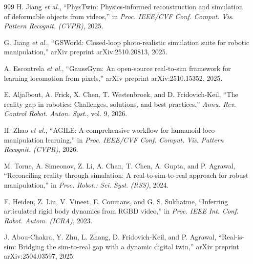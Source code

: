 \documentclass[12pt,a4paper,oneside]{report}
\begin{document}
\begin{thebibliography}{999}
H. Jiang \textit{et al.}, ``PhysTwin: Physics-informed reconstruction and simulation of deformable objects from videos,'' in \textit{Proc. IEEE/CVF Conf. Comput. Vis. Pattern Recognit. (CVPR)}, 2025.




G. Jiang \textit{et al.}, ``{GSWorld}: Closed-loop photo-realistic simulation suite for robotic manipulation,'' arXiv preprint arXiv:2510.20813, 2025.




A. Escontrela \textit{et al.}, ``{GaussGym}: An open-source real-to-sim framework for learning locomotion from pixels,'' arXiv preprint arXiv:2510.15352, 2025.




E. Aljalbout, A. Frick, X. Chen, T. Westenbroek, and D. Fridovich-Keil, ``The reality gap in robotics: Challenges, solutions, and best practices,'' \textit{Annu. Rev. Control Robot. Auton. Syst.}, vol. 9, 2026.




H. Zhao \textit{et al.}, ``{AGILE}: A comprehensive workflow for humanoid loco-manipulation learning,'' in \textit{Proc. IEEE/CVF Conf. Comput. Vis. Pattern Recognit. (CVPR)}, 2026.




M. Torne, A. Simeonov, Z. Li, A. Chan, T. Chen, A. Gupta, and P. Agrawal, ``Reconciling reality through simulation: A real-to-sim-to-real approach for robust manipulation,'' in \textit{Proc. Robot.: Sci. Syst. (RSS)}, 2024.




E. Heiden, Z. Liu, V. Vineet, E. Coumans, and G. S. Sukhatme, ``Inferring articulated rigid body dynamics from RGBD video,'' in \textit{Proc. IEEE Int. Conf. Robot. Autom. (ICRA)}, 2023.




J. Abou-Chakra, Y. Zhu, L. Zhang, D. Fridovich-Keil, and P. Agrawal, ``Real-is-sim: Bridging the sim-to-real gap with a dynamic digital twin,'' arXiv preprint arXiv:2504.03597, 2025.




\end{thebibliography}
\end{document}
